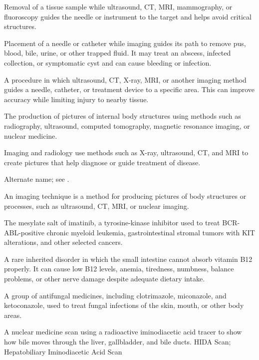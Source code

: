  Removal of a tissue sample while ultrasound, CT, MRI, mammography, or fluoroscopy guides the needle or instrument to the target and helps avoid critical structures.

 Placement of a needle or catheter while imaging guides its path to remove pus, blood, bile, urine, or other trapped fluid. It may treat an abscess, infected collection, or symptomatic cyst and can cause bleeding or infection.

 A procedure in which ultrasound, CT, X-ray, MRI, or another imaging method guides a needle, catheter, or treatment device to a specific area. This can improve accuracy while limiting injury to nearby tissue.

 The production of pictures of internal body structures using methods such as radiography, ultrasound,
computed tomography, magnetic resonance imaging, or nuclear medicine.

 Imaging and radiology use methods such as X-ray, ultrasound, CT, and MRI to create pictures that help diagnose or guide treatment of disease.

 Alternate name; see .

 An imaging technique is a method for producing pictures of body structures or processes, such as ultrasound, CT, MRI, or nuclear imaging.

 The mesylate salt of imatinib, a tyrosine-kinase inhibitor used to treat BCR-ABL-positive chronic myeloid leukemia, gastrointestinal stromal tumors with KIT alterations, and other selected cancers.

 A rare inherited disorder in which the small intestine cannot absorb vitamin B12 properly. It can cause low B12 levels, anemia, tiredness, numbness, balance problems, or other nerve damage despite adequate dietary intake.

 A group of antifungal medicines, including clotrimazole, miconazole, and ketoconazole, used to treat fungal infections of the skin, mouth, or other body areas.

 A nuclear medicine scan using a radioactive iminodiacetic acid tracer to show how bile moves through the liver, gallbladder, and bile ducts.
\synonyms
HIDA Scan; Hepatobiliary Iminodiacetic Acid Scan

